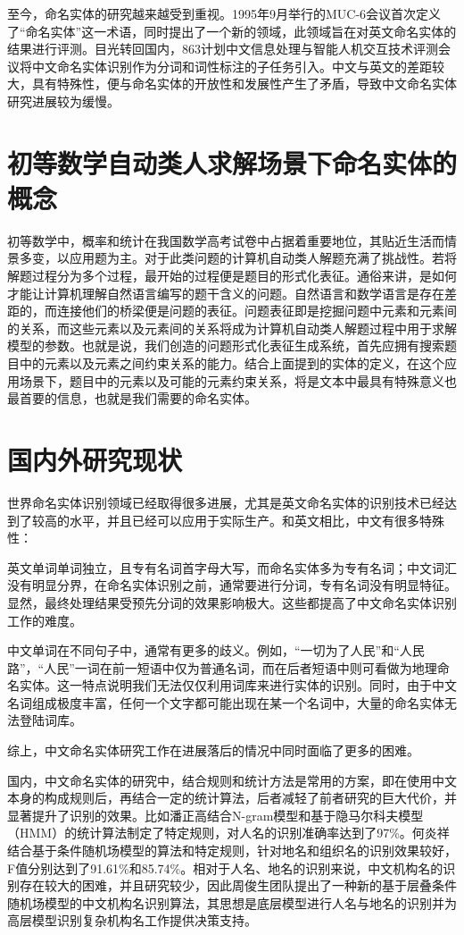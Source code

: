 至今，命名实体的研究越来越受到重视。1995年9月举行的MUC-6会议首次定义了“命名实体”这一术语，同时提出了一个新的领域，此领域旨在对英文命名实体的结果进行评测。目光转回国内，863计划中文信息处理与智能人机交互技术评测会议将中文命名实体识别作为分词和词性标注的子任务引入。中文与英文的差距较大，具有特殊性，便与命名实体的开放性和发展性产生了矛盾，导致中文命名实体研究进展较为缓慢。  

\section{初等数学自动类人求解场景下命名实体的概念}
初等数学中，概率和统计在我国数学高考试卷中占据着重要地位，其贴近生活而情景多变，以应用题为主。对于此类问题的计算机自动类人解题充满了挑战性。若将解题过程分为多个过程，最开始的过程便是题目的形式化表征。通俗来讲，是如何才能让计算机理解自然语言编写的题干含义的问题。自然语言和数学语言是存在差距的，而连接他们的桥梁便是问题的表征。问题表征即是挖掘问题中元素和元素间的关系，而这些元素以及元素间的关系将成为计算机自动类人解题过程中用于求解模型的参数。也就是说，我们创造的问题形式化表征生成系统，首先应拥有搜索题目中的元素以及元素之间约束关系的能力。结合上面提到的实体的定义，在这个应用场景下，题目中的元素以及可能的元素约束关系，将是文本中最具有特殊意义也最首要的信息，也就是我们需要的命名实体。
\section{国内外研究现状}
世界命名实体识别领域已经取得很多进展，尤其是英文命名实体的识别技术已经达到了较高的水平，并且已经可以应用于实际生产。和英文相比，中文有很多特殊性：

英文单词单词独立，且专有名词首字母大写，而命名实体多为专有名词；中文词汇没有明显分界，在命名实体识别之前，通常要进行分词，专有名词没有明显特征。显然，最终处理结果受预先分词的效果影响极大。这些都提高了中文命名实体识别工作的难度。

中文单词在不同句子中，通常有更多的歧义。例如，“一切为了人民”和“人民路”，“人民”一词在前一短语中仅为普通名词，而在后者短语中则可看做为地理命名实体。这一特点说明我们无法仅仅利用词库来进行实体的识别。同时，由于中文名词组成极度丰富，任何一个文字都可能出现在某一个名词中，大量的命名实体无法登陆词库。

综上，中文命名实体研究工作在进展落后的情况中同时面临了更多的困难。

国内，中文命名实体的研究中，结合规则和统计方法是常用的方案，即在使用中文本身的构成规则后，再结合一定的统计算法，后者减轻了前者研究的巨大代价，并显著提升了识别的效果。比如潘正高结合N-gram模型和基于隐马尔科夫模型（HMM）的统计算法制定了特定规则，对人名的识别准确率达到了97\%。何炎祥结合基于条件随机场模型的算法和特定规则，针对地名和组织名的识别效果较好，F值分别达到了91.61\%和85.74\%。相对于人名、地名的识别来说，中文机构名的识别存在较大的困难，并且研究较少，因此周俊生团队提出了一种新的基于层叠条件随机场模型的中文机构名识别算法，其思想是底层模型进行人名与地名的识别并为高层模型识别复杂机构名工作提供决策支持。

